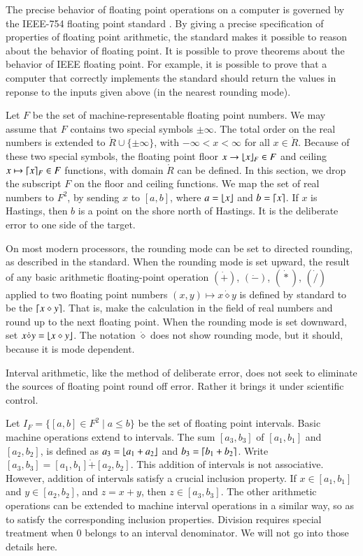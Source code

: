 The precise behavior of floating point operations on a computer is governed by 
the IEEE-754 floating point standard \cite{Gol}.  
By giving a precise specification of properties
of floating point arithmetic, the standard makes it possible to reason about the
behavior of floating point.  It is possible to prove theorems about the behavior
of IEEE floating point.  For example, it is possible to prove that a computer that
correctly implements the standard should return the values in reponse to the inputs
given above (in the nearest rounding mode).  

Let $F$ be the set of machine-representable floating point numbers.  We may assume that $F$ contains two 
 special symbols $\pm\infty$.  The total order on the real numbers is extended to $\ring{R}\cup\{\pm\infty\}$, with $-\infty < x < \infty$ for all $x\in\ring{R}$.
Because of these two special symbols, the floating point floor $x\to\lfloor x\rfloor_F\in F$ and ceiling $x\mapsto\lceil x\rceil_F\in F$ functions, with domain $\ring{R}$ can be defined.   In this section, we drop the subscript $F$ on the
floor and ceiling functions.
We map the set of real numbers to $F^2$, by
sending $x$ to $[a,b]$, where $a = \lfloor x\rfloor$ and $b=\lceil x\rceil$.
If $x$ is Hastings, then $b$ is a point
on the shore north of Hastings.  It is the deliberate error to one side of the target.  





On most modern processors, the rounding mode can be set to directed rounding, as
described in the standard.   When the rounding mode is set upward, the result of
any basic arithmetic floating-point operation $(\dot +)$, $(\dot -)$, $(\dot *)$, $(\dot /)$ applied to two floating
point numbers $(x,y)\mapsto x\dot\diamond y$ is defined by standard to be 
the $\lceil x\diamond y\rceil$.  That is, make the calculation in the field of real numbers and round up to the next floating point.
When the rounding mode is set downward, 
set $x\dot\diamond y = \lfloor x\diamond y\rfloor$.  The notation $\dot\diamond$ does not
show rounding mode, but it should, because it is mode dependent.


Interval arithmetic, like the method of deliberate error, does not seek to eliminate
the sources of floating point round off error.  Rather it brings it under scientific
control.  


Let $I_F = \{[a,b] \in F^2 \mid a \le b\}$ be the set of floating point intervals.
Basic machine operations extend to intervals.  The sum $[a_3,b_3]$ of
$[a_1,b_1]$ and $[a_2,b_2]$, is defined as $a_3=\lfloor a_1+a_2\rfloor$ and
$b_3 = \lceil b_1+b_2\rceil$.  Write $[a_3,b_3] = [a_1,b_1] \dot+ [a_2,b_2]$.
This addition of intervals
is not associative.  However, addition of intervals satisfy a crucial inclusion property.
If $x\in[a_1,b_1]$ and $y\in [a_2,b_2]$, and $z = x+y$,
then $z\in [a_3,b_3]$.  The other arithmetic operations can be extended to machine
interval operations in a similar way, so as to satisfy the corresponding inclusion
properties.    Division requires special treatment when $0$ belongs to an interval
denominator.  We will not go into those details here.  

